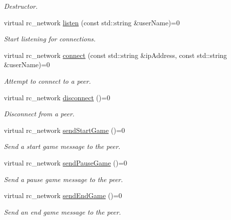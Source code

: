 \begin{DoxyCompactItemize}
\begin{DoxyCompactList}\small\item\em Destructor. \item\end{DoxyCompactList}\item 
virtual rc\_\-network \hyperlink{classNetwork_afb5306e2b769c01780aaa44d2c14306d}{listen} (const std::string \&userName)=0
\begin{DoxyCompactList}\small\item\em Start listening for connections. \item\end{DoxyCompactList}\item 
virtual rc\_\-network \hyperlink{classNetwork_a105f5e229e0ac9ff2b718dd34112c292}{connect} (const std::string \&ipAddress, const std::string \&userName)=0
\begin{DoxyCompactList}\small\item\em Attempt to connect to a peer. \item\end{DoxyCompactList}\item 
virtual rc\_\-network \hyperlink{classNetwork_a1b0e29fc9936615e76c1db95caba0a9e}{disconnect} ()=0
\begin{DoxyCompactList}\small\item\em Disconnect from a peer. \item\end{DoxyCompactList}\item 
virtual rc\_\-network \hyperlink{classNetwork_a3f6b451fd546f2e44eb2c14661bc1ad3}{sendStartGame} ()=0
\begin{DoxyCompactList}\small\item\em Send a start game message to the peer. \item\end{DoxyCompactList}\item 
virtual rc\_\-network \hyperlink{classNetwork_ac60291a8d99468ebc38d085fc0455df0}{sendPauseGame} ()=0
\begin{DoxyCompactList}\small\item\em Send a pause game message to the peer. \item\end{DoxyCompactList}\item 
virtual rc\_\-network \hyperlink{classNetwork_ae3f72f3003309c6d38105f504db8ce05}{sendEndGame} ()=0
\begin{DoxyCompactList}\small\item\em Send an end game message to the peer. \item\end{DoxyCompactList}\item 

\end{DoxyCompactItemize}
